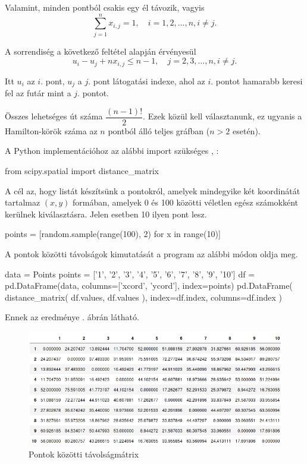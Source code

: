 Valamint, minden pontból csakis egy él távozik, vagyis
\[
\displaystyle
\sum_{j=1}^n x_{i,j} = 1, \quad i = 1, 2, \ldots, n, i \neq j.
\]

A sorrendiség a következő feltétel alapján érvényesül
\[
u_i - u_j + n x_{i,j} \leq n - 1, \quad j = 2, 3, \ldots, n, i \neq j.
\]

Itt $u_{i}$ az $i.$ pont, $u_{j}$ a $j.$ pont látogatási indexe, ahol az $i.$ pontot hamarabb keresi fel az futár mint a $j.$ pontot.


Összes lehetséges út száma
\(
\dfrac{(n-1)!}{2}.
\)
Ezek közül kell választanunk, ez ugyanis a Ha\-mil\-ton-körök száma az $n$ pontból álló teljes gráfban ($n > 2$ esetén).

A Python implementációhoz az alábbi import szükséges \cite{Python}, \cite{Spatial}:
\begin{python}
from scipy.spatial import distance_matrix
\end{python}
A cél az, hogy listát készítsünk a pontokról, amelyek mindegyike két koordinátát tartalmaz $(x, y)$ formában, amelyek 0 és 100 közötti véletlen egész számokként kerülnek kiválasztásra. Jelen esetben 10 ilyen pont lesz.
\begin{python}
points = [random.sample(range(100), 2) for x in range(10)]
\end{python}
A pontok közötti távolságok kimutatását a program az alábbi módon oldja meg.
\begin{python}
data = Points
points = ['1', '2', '3', '4', '5', '6', '7', '8', '9', '10']
df = pd.DataFrame(data, columns=['xcord', 'ycord'], index=points)
pd.DataFrame(
	distance_matrix(
		df.values, 
		df.values
	), 
	index=df.index,
	columns=df.index
)
\end{python}

Ennek az eredménye . ábrán látható.

\begin{figure}[h!]
\centering
\includegraphics[width=\textwidth]{images/table.png}
\caption{Pontok közötti távolságmátrix}
\label{fig:kimenet}
\end{figure}

